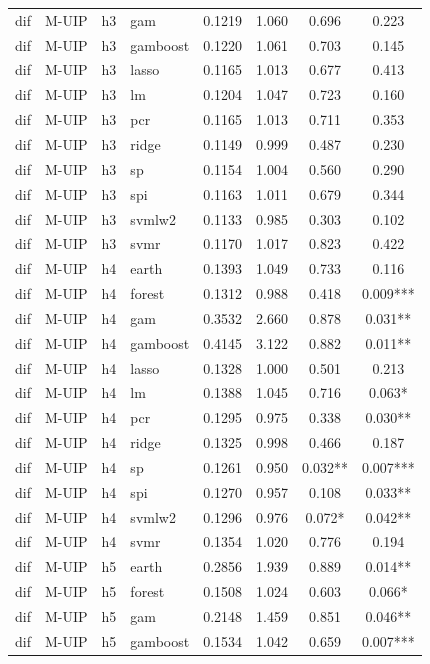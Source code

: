 \begin{ThreePartTable}
\begin{longtable}[t]{llclcccc}
dif & M-UIP & h3 & gam & 0.1219 & 1.060 & 0.696 & 0.223\\
dif & M-UIP & h3 & gamboost & 0.1220 & 1.061 & 0.703 & 0.145\\
dif & M-UIP & h3 & lasso & 0.1165 & 1.013 & 0.677 & 0.413\\
dif & M-UIP & h3 & lm & 0.1204 & 1.047 & 0.723 & 0.160\\
dif & M-UIP & h3 & pcr & 0.1165 & 1.013 & 0.711 & 0.353\\
dif & M-UIP & h3 & ridge & 0.1149 & 0.999 & 0.487 & 0.230\\
dif & M-UIP & h3 & sp & 0.1154 & 1.004 & 0.560 & 0.290\\
dif & M-UIP & h3 & spi & 0.1163 & 1.011 & 0.679 & 0.344\\
dif & M-UIP & h3 & svmlw2 & 0.1133 & 0.985 & 0.303 & 0.102\\
dif & M-UIP & h3 & svmr & 0.1170 & 1.017 & 0.823 & 0.422\\
\addlinespace
dif & M-UIP & h4 & earth & 0.1393 & 1.049 & 0.733 & 0.116\\
dif & M-UIP & h4 & forest & 0.1312 & 0.988 & 0.418 & 0.009***\\
dif & M-UIP & h4 & gam & 0.3532 & 2.660 & 0.878 & 0.031**\\
dif & M-UIP & h4 & gamboost & 0.4145 & 3.122 & 0.882 & 0.011**\\
dif & M-UIP & h4 & lasso & 0.1328 & 1.000 & 0.501 & 0.213\\
dif & M-UIP & h4 & lm & 0.1388 & 1.045 & 0.716 & 0.063*\\
dif & M-UIP & h4 & pcr & 0.1295 & 0.975 & 0.338 & 0.030**\\
dif & M-UIP & h4 & ridge & 0.1325 & 0.998 & 0.466 & 0.187\\
dif & M-UIP & h4 & sp & 0.1261 & 0.950 & 0.032** & 0.007***\\
dif & M-UIP & h4 & spi & 0.1270 & 0.957 & 0.108 & 0.033**\\
dif & M-UIP & h4 & svmlw2 & 0.1296 & 0.976 & 0.072* & 0.042**\\
dif & M-UIP & h4 & svmr & 0.1354 & 1.020 & 0.776 & 0.194\\
\addlinespace
dif & M-UIP & h5 & earth & 0.2856 & 1.939 & 0.889 & 0.014**\\
dif & M-UIP & h5 & forest & 0.1508 & 1.024 & 0.603 & 0.066*\\
dif & M-UIP & h5 & gam & 0.2148 & 1.459 & 0.851 & 0.046**\\
dif & M-UIP & h5 & gamboost & 0.1534 & 1.042 & 0.659 & 0.007***\\

\end{longtable}
\end{ThreePartTable}
